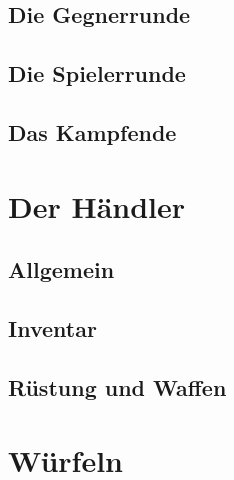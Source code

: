 \documentclass[11pt, a4paper, german]{article}
\begin{document}
\subsection{Die Gegnerrunde}
\subsection{Die Spielerrunde}
\subsection{Das Kampfende}

\section{Der Händler}
\subsection{Allgemein}
\subsection{Inventar}
\subsection{Rüstung und Waffen}

\section{Würfeln}
\end{document}
